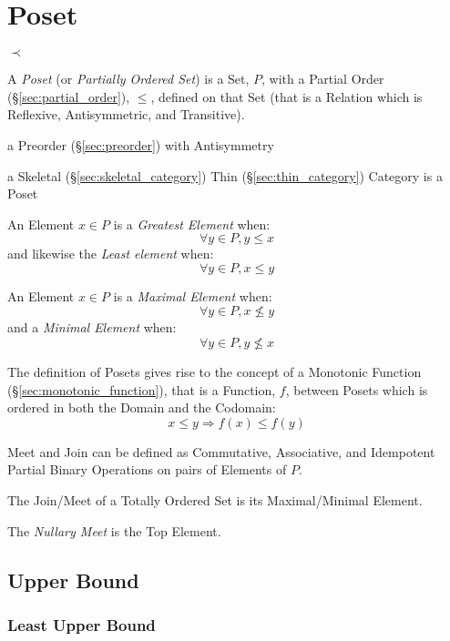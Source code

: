 \section{Poset}\label{sec:poset}

$\prec$

A \emph{Poset} (or \emph{Partially Ordered Set}) is a Set, $P$, with a
Partial Order (\S\ref{sec:partial_order}), $\leq$, defined on that
Set (that is a Relation which is Reflexive, Antisymmetric, and
Transitive).

a Preorder (\S\ref{sec:preorder}) with Antisymmetry

a Skeletal (\S\ref{sec:skeletal_category}) Thin
(\S\ref{sec:thin_category}) Category is a Poset

An Element $x \in P$ is a \emph{Greatest Element} when:
\[
  \forall y \in P, y \leq x
\]
and likewise the \emph{Least element} when:
\[
  \forall y \in P, x \leq y
\]

An Element $x \in P$ is a \emph{Maximal Element} when:
\[
  \forall y \in P, x \nleq y
\]
and a \emph{Minimal Element} when:
\[
  \forall y \in P, y \nleq x
\]

The definition of Posets gives rise to the concept of a Monotonic
Function (\S\ref{sec:monotonic_function}), that is a Function, $f$,
between Posets which is ordered in both the Domain and the Codomain:
\[
  x \leq y \Rightarrow f(x) \leq f(y)
\]


Meet and Join can be defined as Commutative, Associative, and
Idempotent Partial Binary Operations on pairs of Elements of $P$.

The Join/Meet of a Totally Ordered Set is its Maximal/Minimal Element.

The \emph{Nullary Meet} is the Top Element.



\subsection{Upper Bound}\label{sec:upper_bound}

\subsubsection{Least Upper Bound}\label{sec:least_upperbound}

